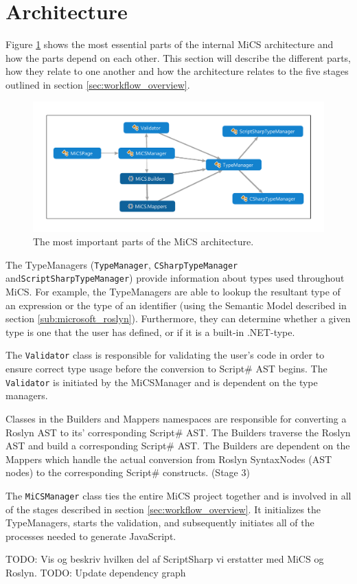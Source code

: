\section{Architecture} %
\label{sec:architecture}
Figure \ref{fig:dependencygraph} shows the most essential parts of the internal MiCS architecture and how the parts depend on each other. 
This section will describe the different parts, how they relate to one another and how the architecture relates to the five stages outlined in section \ref{sec:workflow_overview}. 

\begin{figure}
	\begin{center}
		\centerline{\includegraphics[width=15cm]{resources/images/architecture.pdf}}
	\end{center}
	\caption{The most important parts of the MiCS architecture.}
	\label{fig:dependencygraph}
\end{figure}


The TypeManagers (\texttt{TypeManager}, \texttt{CSharpTypeManager} and\newline \texttt{ScriptSharpTypeManager}) provide information about types used throughout MiCS. For example, the TypeManagers are able to lookup the resultant type of an expression or the type of an identifier (using the Semantic Model described in section \ref{sub:microsoft_roslyn}). Furthermore, they can determine whether a given type is one that the user has defined, or if it is a built-in .NET-type.

The \texttt{Validator} class is responsible for validating the user's code in order to ensure correct type usage before the conversion to Script\# AST begins. The \texttt{Validator} is initiated by the MiCSManager and is dependent on the type managers.

Classes in the Builders and Mappers namespaces are responsible for converting a Roslyn AST to its' corresponding Script\# AST. The Builders traverse the Roslyn AST and build a corresponding Script\# AST. The Builders are dependent on the Mappers which handle the actual conversion from Roslyn SyntaxNodes (AST nodes) to the corresponding Script\# constructs. (Stage 3)

The \texttt{MiCSManager} class ties the entire MiCS project together and is involved in all of the stages described in section \ref{sec:workflow_overview}. It initializes the TypeManagers, starts the validation, and subsequently initiates all of the processes needed to generate JavaScript. 

TODO: Vis og beskriv hvilken del af ScriptSharp vi erstatter med MiCS og Roslyn.
TODO: Update dependency graph

